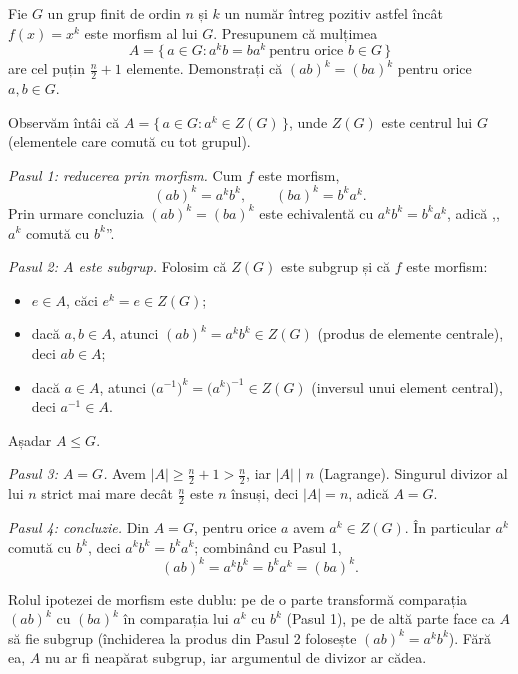 \begin{problema}
Fie $G$ un grup finit de ordin $n$ și $k$ un număr întreg
pozitiv astfel încât $f(x)=x^{k}$ este morfism al lui $G$.
Presupunem că mulțimea
\[
  A = \{\, a \in G : a^{k}b = ba^{k} \ \text{pentru orice } b \in G \,\}
\]
are cel puțin $\tfrac{n}{2}+1$ elemente. Demonstrați că
$(ab)^{k}=(ba)^{k}$ pentru orice $a,b \in G$.
\end{problema}

\begin{solutie}
Observăm întâi că $A=\{\,a\in G : a^{k}\in Z(G)\,\}$, unde
$Z(G)$ este centrul lui $G$ (elementele care comută cu tot grupul).

\smallskip
\textit{Pasul 1: reducerea prin morfism.} Cum $f$ este morfism,
\[
  (ab)^{k}=a^{k}b^{k}, \qquad (ba)^{k}=b^{k}a^{k}.
\]
Prin urmare concluzia $(ab)^{k}=(ba)^{k}$ este echivalentă cu
$a^{k}b^{k}=b^{k}a^{k}$, adică ,,$a^{k}$ comută cu $b^{k}$''.

\smallskip
\textit{Pasul 2: $A$ este subgrup.} Folosim că $Z(G)$ este subgrup
și că $f$ este morfism:
\begin{itemize}[nosep,leftmargin=1.4em]
  \item $e \in A$, căci $e^{k}=e\in Z(G)$;
  \item dacă $a,b \in A$, atunci $(ab)^{k}=a^{k}b^{k}\in Z(G)$ (produs de
        elemente centrale), deci $ab\in A$;
  \item dacă $a \in A$, atunci $\bigl(a^{-1}\bigr)^{k}=\bigl(a^{k}\bigr)^{-1}\in Z(G)$
        (inversul unui element central), deci $a^{-1}\in A$.
\end{itemize}
Așadar $A \leq G$.

\smallskip
\textit{Pasul 3: $A=G$.} Avem $|A|\ge \tfrac{n}{2}+1 > \tfrac{n}{2}$, iar
$|A|\mid n$ (Lagrange). Singurul divizor al lui $n$ strict mai mare decât
$\tfrac{n}{2}$ este $n$ însuși, deci $|A|=n$, adică $A=G$.

\smallskip
\textit{Pasul 4: concluzie.} Din $A=G$, pentru orice $a$ avem
$a^{k}\in Z(G)$. În particular $a^{k}$ comută cu $b^{k}$, deci
$a^{k}b^{k}=b^{k}a^{k}$; combinând cu Pasul 1,
\[
  (ab)^{k}=a^{k}b^{k}=b^{k}a^{k}=(ba)^{k}.
\]
\end{solutie}

\begin{obs}
Rolul ipotezei de morfism este dublu: pe de o parte transformă
comparația $(ab)^{k}$ cu $(ba)^{k}$ în comparația lui $a^{k}$ cu
$b^{k}$ (Pasul 1), pe de altă parte face ca $A$ să fie subgrup
(închiderea la produs din Pasul 2 folosește $(ab)^{k}=a^{k}b^{k}$).
Fără ea, $A$ nu ar fi neapărat subgrup, iar argumentul de
divizor ar cădea.
\end{obs}

